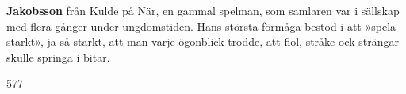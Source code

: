 \textbf{Jakobsson} från Kulde på När, en gammal spelman, som samlaren var i sällskap med flera gånger under ungdomstiden. Hans största förmåga bestod i att »spela starkt», ja så starkt, att man varje ögonblick trodde, att fiol, stråke ock strängar skulle springa i bitar. 

577 

